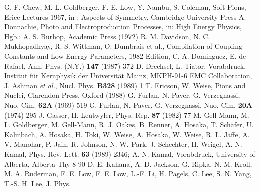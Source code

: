 \begin{thebibliography}{ABC.99}
 G. F. Chew, M. L. Goldberger, F. E. Low, Y. Nambu,
 S. Coleman, Soft Pions, Erice Lectures 1967, 
              in : Aspects of Symmetry, Cambridge University Press 	      
 A. Donnachie, Photo and Electroproduction Processes,
              in: High Energy Physics, Hgb.: A. S. Burhop, Academic Press
	      (1972)	
 R. M. Davidson, N. C. Mukhopadhyay, R. S. Wittman,
 O. Dumbrais et al., Compilation of Coupling Constants
              and Low-Energy Parameters, 1982-Edition,       
 C. A. Dominguez, E. de Rafael, Ann. Phys. (N.Y.)
              {\bf 147} (1987) 372	 
 D. Drechsel, L. Tiator, Vorabdruck, Institut f\"ur 
              Kernphysik der Universit\"at Mainz, MKPH-91-6 	    
 EMC Collaboration, J. Ashman {\em et al.}, Nucl. Phys. 
              {\bf B328} (1989) 1
 T. Ericson, W. Weise, Pions and Nuclei, Clarendon 
              Press, Oxford (1988)	      
 G. Furlan, N. Paver, G. Verzegnassi, Nuo. Cim. {\bf 62A} 
              (1969) 519
 G. Furlan, N. Paver, G. Verzegnassi, Nuo. Cim. {\bf 20A}
              (1974) 295
 J. Gasser, H. Leutwyler, Phys. Rep. {\bf 87} (1982) 77
 M. Gell-Mann, M. L. Goldberger, 
 M. Gell-Mann, R. J. Oakes, B. Renner, 
 A. Hosaka, T. Sch\"afer, U. Kalmbach,      
 A. Hosaka, H. Toki, W. Weise, 
 A. Hosaka, W. Weise,   
 R. L. Jaffe, A. V. Manohar, 
 P. Jain, R. Johnson, N. W. Park, J. Schechter,
              H. Weigel, 
 A. N. Kamal, Phys. Rev. Lett. 
              {\bf 63} (1989) 2346;
 A. N. Kamal, Vorabdruck, University of Alberta,
              Alberta Thy-8-90
 D. E. Kahana, A. D. Jackson, G. Ripka,
 N. M. Kroll, M. A. Ruderman, 
 F. E. Low, 	      	      
 F. E. Low, 
 L.-F. Li, H. Pagels, 
 C. Lee, S. N. Yang, T.-S. H. Lee, J. Phys. 

\end{thebibliography}
